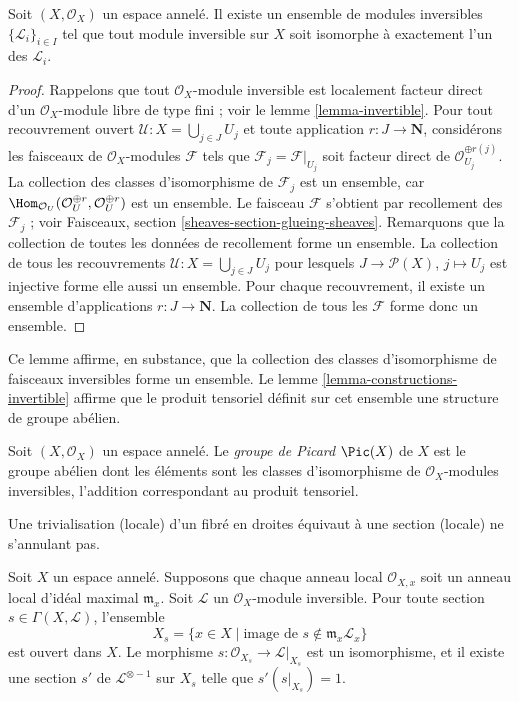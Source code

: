 \begin{lemma}
\label{lemma-pic-set}
Soit $(X, \mathcal{O}_X)$ un espace annelé.
Il existe un ensemble de modules inversibles $\{\mathcal{L}_i\}_{i \in I}$
tel que tout module inversible sur $X$ soit isomorphe à exactement
l'un des $\mathcal{L}_i$.
\end{lemma}

\begin{proof}
Rappelons que tout $\mathcal{O}_X$-module inversible est localement
facteur direct d'un $\mathcal{O}_X$-module libre de type fini ; voir le
lemme \ref{lemma-invertible}.
Pour tout recouvrement ouvert $\mathcal{U} : X = \bigcup_{j \in J} U_j$
et toute application $r : J \to \mathbf{N}$, considérons les faisceaux de
$\mathcal{O}_X$-modules $\mathcal{F}$ tels que
$\mathcal{F}_j = \mathcal{F}|_{U_j}$ soit facteur direct de
$\mathcal{O}_{U_j}^{\oplus r(j)}$.
La collection des classes d'isomorphisme de $\mathcal{F}_j$ est un ensemble, car
$\Hom_{\mathcal{O}_U}(\mathcal{O}_U^{\oplus r}, \mathcal{O}_U^{\oplus r})$
est un ensemble. Le faisceau $\mathcal{F}$ s'obtient par recollement des $\mathcal{F}_j$ ;
voir Faisceaux, section
\ref{sheaves-section-glueing-sheaves}. Remarquons que la collection de
toutes les données de recollement forme un ensemble. La collection de tous les recouvrements
$\mathcal{U} : X = \bigcup_{j \in J} U_j$ pour lesquels $J \to \mathcal{P}(X)$,
$j \mapsto U_j$ est injective forme elle aussi un ensemble. Pour chaque recouvrement,
il existe un ensemble d'applications $r : J \to \mathbf{N}$. La collection
de tous les $\mathcal{F}$ forme donc un ensemble.
\end{proof}

\noindent
Ce lemme affirme, en substance, que la collection des
classes d'isomorphisme de faisceaux inversibles forme un ensemble.
Le lemme \ref{lemma-constructions-invertible} affirme que
le produit tensoriel définit sur cet ensemble une structure de groupe
abélien.

\begin{definition}
\label{definition-pic}
Soit $(X, \mathcal{O}_X)$ un espace annelé.
Le {\it groupe de Picard} $\Pic(X)$ de $X$ est le
groupe abélien dont les éléments sont les classes d'isomorphisme de
$\mathcal{O}_X$-modules inversibles, l'addition
correspondant au produit tensoriel.
\end{definition}

\begin{lemma}
\label{lemma-s-open}
\begin{slogan}
Une trivialisation (locale) d'un fibré en droites
équivaut à une section (locale) ne s'annulant pas.
\end{slogan}
Soit $X$ un espace annelé. Supposons que chaque anneau local $\mathcal{O}_{X, x}$
soit un anneau local d'idéal maximal $\mathfrak m_x$.
Soit $\mathcal{L}$ un $\mathcal{O}_X$-module inversible.
Pour toute section $s \in \Gamma(X, \mathcal{L})$, l'ensemble
$$
X_s = \{x \in X \mid \text{image de }s \not\in \mathfrak m_x\mathcal{L}_x\}
$$
est ouvert dans $X$. Le morphisme $s : \mathcal{O}_{X_s} \to \mathcal{L}|_{X_s}$
est un isomorphisme, et il existe une section $s'$
de $\mathcal{L}^{\otimes -1}$ sur $X_s$ telle que $s' (s|_{X_s}) = 1$.
\end{lemma}

